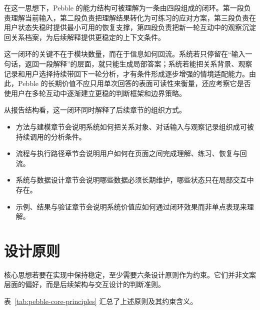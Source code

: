 在这一思想下，Pebble 的能力结构可被理解为一条由四段组成的闭环。第一段负责理解当前输入，第二段负责把理解结果转化为可练习的应对方案，第三段负责在用户状态失稳时提供最小可用的恢复支撑，第四段负责把新一轮互动中的观察沉淀回关系档案，为后续解释提供更稳定的上下文条件。

这一闭环的关键不在于模块数量，而在于信息如何回流。系统若只停留在“输入一句话，返回一段解释”的层面，就只能生成局部答案；系统若能把关系背景、观察记录和用户选择持续带回下一轮分析，才有条件形成逐步增强的情境适配能力。由此，Pebble 的长期价值不应只用单次回答的表面可读性来衡量，还应考察它是否使用户在多轮互动中逐渐建立更稳的判断框架和边界策略。

从报告结构看，这一闭环同时解释了后续章节的组织方式。

\begin{itemize}
  \item 方法与建模章节会说明系统如何把关系对象、对话输入与观察记录组织成可被持续调用的分析条件。
  \item 流程与执行路径章节会说明用户如何在页面之间完成理解、练习、恢复与回流。
  \item 系统与数据设计章节会说明哪些数据必须长期维护，哪些状态只在局部交互中存在。
  \item 示例、结果与验证章节会说明系统价值应如何通过闭环效果而非单点表现来理解。
\end{itemize}

\section{设计原则}

核心思想若要在实现中保持稳定，至少需要六条设计原则作为约束。它们并非文案层面的偏好，而是后续架构与交互设计的判断准则。

表~\ref{tab:pebble-core-principles} 汇总了上述原则及其约束含义。

